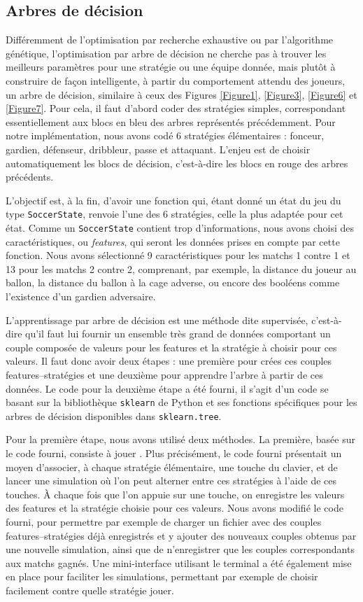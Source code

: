 \documentclass[a4paper,12pt]{article}
\begin{document}
\subsection{Arbres de décision}

Différemment de l'optimisation par recherche exhaustive ou par l'algorithme génétique, l'optimisation par arbre de décision ne cherche pas à trouver les meilleurs paramètres pour une stratégie ou une équipe donnée, mais plutôt à construire de façon intelligente, à partir du comportement attendu des joueurs, un arbre de décision, similaire à ceux des Figures \ref{Figure1}, \ref{Figure3}, \ref{Figure6} et \ref{Figure7}. Pour cela, il faut d'abord coder des stratégies simples, correspondant essentiellement aux blocs en bleu des arbres représentés précédemment. Pour notre implémentation, nous avons codé 6 stratégies élémentaires : fonceur, gardien, défenseur, dribbleur, passe et attaquant. L'enjeu est de choisir automatiquement les blocs de décision, c'est-à-dire les blocs en rouge des arbres précédents.

L'objectif est, à la fin, d'avoir une fonction qui, étant donné un état du jeu du type \texttt{SoccerState}, renvoie l'une des 6 stratégies, celle la plus adaptée pour cet état. Comme un \texttt{SoccerState} contient trop d'informations, nous avons choisi des caractéristiques, ou \emph{features}, qui seront les données prises en compte par cette fonction. Nous avons sélectionné 9 caractéristiques pour les matchs 1 contre 1 et 13 pour les matchs 2 contre 2, comprenant, par exemple, la distance du joueur au ballon, la distance du ballon à la cage adverse, ou encore des booléens comme l'existence d'un gardien adversaire.

L'apprentissage par arbre de décision est une méthode dite supervisée, c'est-à-dire qu'il faut lui fournir un ensemble très grand de données comportant un couple composée de valeurs pour les features et la stratégie à choisir pour ces valeurs. Il faut donc avoir deux étapes : une première pour crées ces couples features--stratégies et une deuxième pour apprendre l'arbre à partir de ces données. Le code pour la deuxième étape a été fourni, il s'agit d'un code se basant sur la bibliothèque \texttt{sklearn} de Python et ses fonctions spécifiques pour les arbres de décision disponibles dans \texttt{sklearn.tree}.

Pour la première étape, nous avons utilisé deux méthodes. La première, basée sur le code fourni, consiste à \og jouer \fg. Plus précisément, le code fourni présentait un moyen d'associer, à chaque stratégie élémentaire, une touche du clavier, et de lancer une simulation où l'on peut alterner entre ces stratégies à l'aide de ces touches. À chaque fois que l'on appuie sur une touche, on enregistre les valeurs des features et la stratégie choisie pour ces valeurs. Nous avons modifié le code fourni, pour permettre par exemple de charger un fichier avec des couples features--stratégies déjà enregistrés et y ajouter des nouveaux couples obtenus par une nouvelle simulation, ainsi que de n'enregistrer que les couples correspondants aux matchs gagnés. Une mini-interface utilisant le terminal a été également mise en place pour faciliter les simulations, permettant par exemple de choisir facilement contre quelle stratégie jouer.
\end{document}
